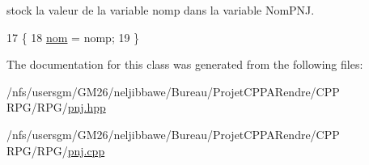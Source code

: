 stock la valeur de la variable nomp dans la variable Nom\-P\-N\-J. 


\begin{DoxyCode}
17                                 \{
18     \hyperlink{class_personnage_acb7331b96dfc9f2aec78c60799030302}{nom} = nomp;
19 \}
\end{DoxyCode}


The documentation for this class was generated from the following files\-:\begin{DoxyCompactItemize}
\item 
/nfs/usersgm/\-G\-M26/neljibbawe/\-Bureau/\-Projet\-C\-P\-P\-A\-Rendre/\-C\-P\-P R\-P\-G/\-R\-P\-G/\hyperlink{pnj_8hpp}{pnj.\-hpp}\item 
/nfs/usersgm/\-G\-M26/neljibbawe/\-Bureau/\-Projet\-C\-P\-P\-A\-Rendre/\-C\-P\-P R\-P\-G/\-R\-P\-G/\hyperlink{pnj_8cpp}{pnj.\-cpp}\end{DoxyCompactItemize}
